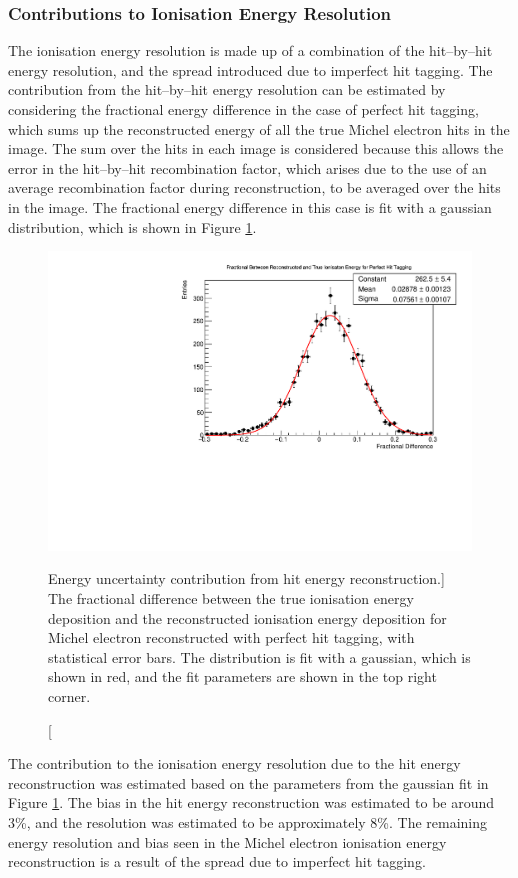 \subsubsection*{Contributions to Ionisation Energy Resolution}
The ionisation energy resolution is made up of a combination of the hit--by--hit
energy resolution, and the spread introduced due to imperfect hit tagging. The
contribution from the hit--by--hit energy resolution can be estimated by
considering the fractional energy difference in the case of perfect hit tagging,
which sums up the reconstructed energy of all the true Michel electron hits in
the image. The sum over the hits in each image is considered because this
allows the error in the hit--by--hit recombination factor, which arises due to
the use of an average recombination factor during reconstruction, to be 
averaged over the hits in the image. The fractional energy difference in this
case is fit with a gaussian distribution, which is shown in Figure
\ref{fig:michel_hit_res}. 
\begin{figure}
	\centering
	\includegraphics[width=\textwidth]{figures/michel_hit_energy_resolution.pdf}
	\caption
	[Energy uncertainty contribution from hit energy reconstruction.]
	{The fractional difference between the true ionisation energy deposition and
	the reconstructed ionisation energy deposition for Michel electron
	reconstructed with perfect hit tagging, with statistical error bars. The 
	distribution is fit with a gaussian, which is shown in red, and the fit 
	parameters are shown in the top right corner.}
	\label{fig:michel_hit_res}
\end{figure}

The contribution to the ionisation energy resolution due to the hit energy
reconstruction was estimated based on the parameters from the gaussian fit in
Figure \ref{fig:michel_hit_res}. The bias in the hit energy reconstruction was 
estimated to be around 3\%, and the resolution was estimated to be 
approximately 8\%. The remaining energy resolution and bias seen in the Michel 
electron ionisation energy reconstruction is a result of the spread due to 
imperfect hit tagging.


